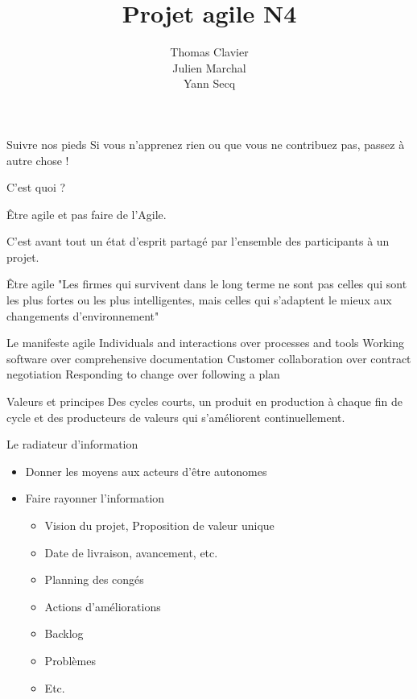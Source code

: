 \documentclass{beamer}
\title{Projet agile N4}
\author{
  Thomas Clavier \\
  Julien Marchal \\
  Yann Secq 
}
\date{}
\begin{document}
\frame{\titlepage}

\begin{frame}{Suivre nos pieds}
  \Large Si vous n’apprenez rien ou que vous ne contribuez pas, passez à autre chose !
\end{frame}

\begin{frame}{C'est quoi ?}
 
  {\Large \alert{Être agile} et pas faire de l'Agile.}

  \vspace{6mm}
  C'est avant tout un état d'esprit partagé par l'ensemble des participants à un projet.
\end{frame}

\begin{frame}{Être agile}
  "Les firmes qui survivent dans le long terme ne sont pas celles qui sont les plus fortes ou les plus intelligentes, mais celles qui s'adaptent le mieux aux changements d'environnement"


\end{frame}

\begin{frame}{Le manifeste agile}
  \large
  \alert{Individuals and interactions} over processes and tools\newline
  \alert{Working software} over comprehensive documentation\newline
  \alert{Customer collaboration} over contract negotiation\newline
  \alert{Responding to change} over following a plan
\end{frame}

\begin{frame}{Valeurs et principes}
  \Large Des cycles courts, un produit en production à chaque fin de cycle et des producteurs de valeurs qui s'améliorent continuellement.
\end{frame}

\begin{frame}{Le radiateur d'information}
  \begin{itemize}
    \item Donner les moyens aux acteurs d'être autonomes
    \item Faire rayonner l'information
    
    \begin{itemize}
      \item Vision du projet, Proposition de valeur unique
      \item Date de livraison, avancement, etc.
      \item Planning des congés
      \item Actions d'améliorations
      \item Backlog
      \item Problèmes
      \item Etc.
    \end{itemize}
  \end{itemize}
\end{frame}
\end{document}
